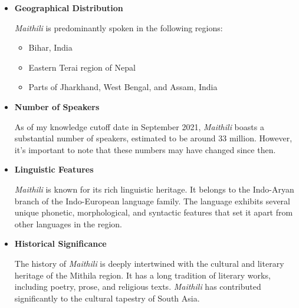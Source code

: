 \documentclass[17pt]{extarticle}
\begin{document}
\begin{itemize}
    \item{\textbf{Geographical Distribution}}

\emph{Maithili} is predominantly spoken in the following regions:
\begin{itemize}
    \item Bihar, India
    \item Eastern Terai region of Nepal
    \item Parts of Jharkhand, West Bengal, and Assam, India
\end{itemize}

\item{\textbf{Number of Speakers}}

As of my knowledge cutoff date in September 2021, \emph{Maithili} boasts a substantial number of speakers, estimated to be around 33 million. However, it's important to note that these numbers may have changed since then.

\item{\textbf{Linguistic Features}}

\emph{Maithili} is known for its rich linguistic heritage. It belongs to the Indo-Aryan branch of the Indo-European language family. The language exhibits several unique phonetic, morphological, and syntactic features that set it apart from other languages in the region.

\item{\textbf{Historical Significance}}

The history of \emph{Maithili} is deeply intertwined with the cultural and literary heritage of the Mithila region. It has a long tradition of literary works, including poetry, prose, and religious texts. \emph{Maithili} has contributed significantly to the cultural tapestry of South Asia.
\end{itemize}
\end{document}
